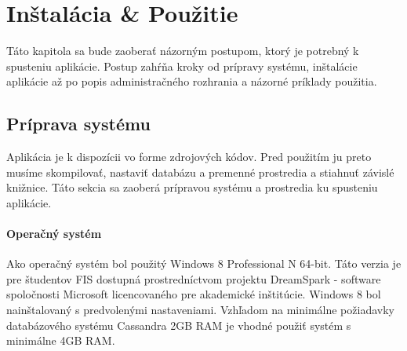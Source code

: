 \chapter{Inštalácia \& Použitie}
	Táto kapitola sa bude zaoberať názorným postupom, ktorý je potrebný k spusteniu aplikácie. Postup zahŕňa kroky od prípravy systému, inštalácie aplikácie až po popis administračného rozhrania a názorné príklady použitia.
	
		
\section{Príprava systému}
	Aplikácia je k dispozícii vo forme zdrojových kódov. Pred použitím ju preto musíme skompilovať, nastaviť databázu a premenné prostredia a stiahnuť závislé knižnice. Táto sekcia sa zaoberá prípravou systému a prostredia ku spusteniu aplikácie.

\subsubsection{Operačný systém}
	Ako operačný systém bol použitý Windows 8 Professional N 64-bit. Táto verzia je pre študentov FIS dostupná prostredníctvom projektu DreamSpark - software spoločnosti Microsoft licencovaného pre akademické inštitúcie. Windows 8 bol nainštalovaný s predvolenými nastaveniami. Vzhľadom na minimálne požiadavky databázového systému Cassandra 2GB RAM je vhodné použiť systém s minimálne 4GB RAM.

